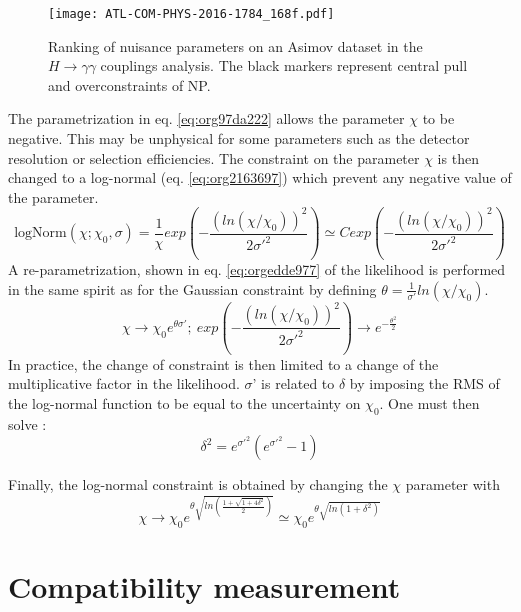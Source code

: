 \begin{figure}[htbp]
\centering
\texttt{[image: ATL-COM-PHYS-2016-1784\_168f.pdf]}
\caption{\label{fig:orgc0d4446}
Ranking of nuisance parameters on an Asimov dataset in the \(H\rightarrow\gamma\gamma\) couplings analysis. The black markers represent central pull and overconstraints of NP.\cite{ATL-COM-PHYS-2016-1784}}
\end{figure}


The parametrization in eq. \ref{eq:org97da222} allows the parameter \(\chi\) to be negative.
This may be unphysical for some parameters such as the detector resolution or selection efficiencies.
The constraint on the parameter \(\chi\) is then changed to a log-normal (eq. \ref{eq:org2163697}) which prevent any negative value of the parameter.
\begin{equation}
\label{eq:org2163697}
\text{logNorm}(\chi; \chi_0, \sigma) = \frac{1}{\chi} exp \left( - \frac{(ln (\chi/\chi_0))^2}{2\sigma'^2}   \right) \simeq C exp \left( - \frac{(ln (\chi/\chi_0))^2}{2\sigma'^2} \right)
\end{equation}
A re-parametrization, shown in eq. \ref{eq:orgedde977} of the likelihood is performed in the same spirit as for the Gaussian constraint by defining \(\theta = \frac{1}{\sigma'} ln(\chi/\chi_0)\).
\begin{equation}
\label{eq:orgedde977}
\chi\rightarrow\chi_0e^{\theta\sigma'}; \ exp \left( - \frac{(ln (\chi/\chi_0))^2}{2\sigma'^2} \right) \rightarrow e^{-\frac{\theta^2}{2}}
\end{equation}
In practice, the change of constraint is then limited to a change of the multiplicative factor in the likelihood.
\(\sigma\)' is related to \(\delta\) by imposing the RMS of the log-normal function to be equal to the uncertainty on \(\chi_{\text{0}}\).
One must then solve :
\begin{equation}
\delta^2 = e^{\sigma'^2}(e^{\sigma'^2}-1)
\end{equation}


Finally, the log-normal constraint is obtained by changing the \(\chi\) parameter with
\begin{equation}
\label{eq:org9060827}
\chi\rightarrow\chi_0 e^{\theta\sqrt{ln\left(\frac{1+\sqrt{1+4\delta^2}}{2}\right)}} \simeq \chi_0 e^{\theta\sqrt{ln(1+\delta^2)}}
\end{equation}


\section{Compatibility measurement}
\label{sec:orga82e3f9}
\label{sec:stat_confidenceInterval}
